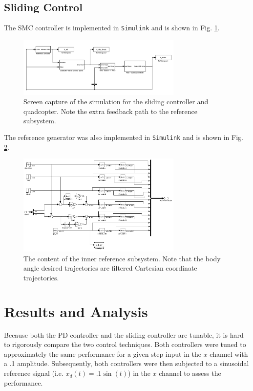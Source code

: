 \documentclass[conference]{IEEEtran}
\begin{document}
\subsection{Sliding Control} 
The SMC controller is implemented in \verb|Simulink| and is shown in Fig. \ref{fig:smc_mdl}.
\begin{figure}[!ht]
\centering
\includegraphics[width=3.2in]{images/smc_mdl.png}
\caption{Screen capture of the simulation for the sliding controller and quadcopter. Note the extra feedback path to the reference subsystem.}
\label{fig:smc_mdl}
\end{figure}

The reference generator was also implemented in \verb|Simulink| and is shown in Fig. \ref{fig:smc_ref_mdl}.
\begin{figure}[!ht]
\centering
\includegraphics[width=3.2in]{images/smc_ref_mdl.png}
\caption{The content of the inner reference subsystem. Note that the body angle desired trajectories are filtered Cartesian coordinate trajectories.}
\label{fig:smc_ref_mdl}
\end{figure}

\section{Results and Analysis} \label{results}
Because both the PD controller and the sliding controller are tunable, it is hard to rigorously compare the two control techniques. Both controllers were tuned to approximately the same performance for a given step input in the $x$ channel with a .1 amplitude. Subsequently, both controllers were then subjected to a sinusoidal reference signal (i.e. $x_d(t) = .1\sin{(t)}$) in the $x$ channel to assess the performance.
\end{document}
